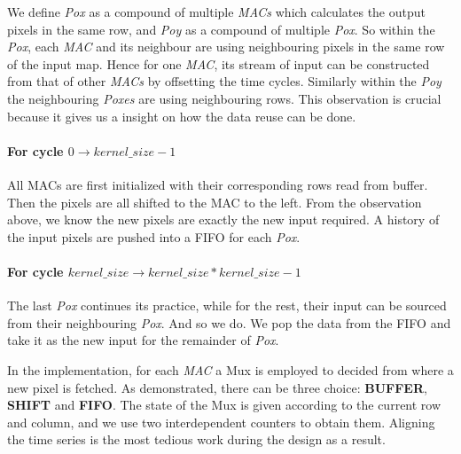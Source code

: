 We define \textit{Pox} as a compound of multiple \textit{MACs} which calculates the output pixels in the same row, and \textit{Poy} as a compound of multiple \textit{Pox}. So within the \textit{Pox}, each \textit{MAC} and its neighbour are using neighbouring pixels in the same row of the input map. Hence for one \textit{MAC}, its stream of input can be constructed from that of other \textit{MACs} by offsetting the time cycles. Similarly within the \textit{Poy} the neighbouring \textit{Poxes} are using neighbouring rows. This observation is crucial because it gives us a insight on how the data reuse can be done.

\paragraph{ For cycle $0 \to kernel\_size-1$} All MACs are first initialized with their corresponding rows read from buffer. Then the pixels are all shifted to the MAC to the left. From the observation above, we know the new pixels are exactly the new input required. A history of the input pixels are pushed into a FIFO for each \textit{Pox}.
\paragraph{ For cycle $kernel\_size \to kernel\_size * kernel\_size - 1$} The last \textit{Pox} continues its practice, while for the rest, their input can be sourced from their neighbouring \textit{Pox}. And so we do. We pop the data from the FIFO and take it as the new input for the remainder of \textit{Pox}.


In the implementation, for each \textit{MAC} a Mux is employed to decided from where a new pixel is fetched. As demonstrated, there can be three choice: \textbf{BUFFER}, \textbf{SHIFT} and \textbf{FIFO}. The state of the Mux is given according to the current row and column, and we use two interdependent counters to obtain them. Aligning the time series is the most tedious work during the design as a result.